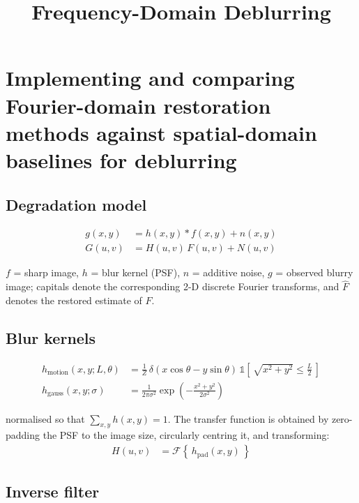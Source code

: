 \documentclass[11pt]{article}
\title{Frequency-Domain Deblurring}
\begin{document}
\maketitle

\newpage

\section*{Implementing and comparing Fourier-domain restoration methods against spatial-domain baselines for deblurring}

\subsection*{Degradation model}

\begin{align}
  g(x,y) &= h(x,y) * f(x,y) + n(x,y) \\
  G(u,v) &= H(u,v)\,F(u,v) + N(u,v)
\end{align}

\noindent $f$ = sharp image, $h$ = blur kernel (PSF), $n$ = additive noise, $g$ = observed
blurry image; capitals denote the corresponding 2-D discrete Fourier transforms, and
$\hat{F}$ denotes the restored estimate of $F$.

\subsection*{Blur kernels}

\begin{align}
  h_{\text{motion}}(x,y;L,\theta)
    &= \frac{1}{Z}\,\delta\!\left(x\cos\theta - y\sin\theta\right)\,
       \mathbb{1}\!\left[\,\sqrt{x^{2}+y^{2}} \le \tfrac{L}{2}\,\right] \\[4pt]
  h_{\text{gauss}}(x,y;\sigma)
    &= \frac{1}{2\pi\sigma^{2}}
       \exp\!\left(-\frac{x^{2}+y^{2}}{2\sigma^{2}}\right)
\end{align}

\noindent normalised so that $\sum_{x,y} h(x,y) = 1$. The transfer function is obtained by
zero-padding the PSF to the image size, circularly centring it, and transforming:
\begin{align}
  H(u,v) &= \mathcal{F}\!\left\{\,h_{\text{pad}}(x,y)\,\right\}
\end{align}

\subsection*{Inverse filter}
\end{document}
